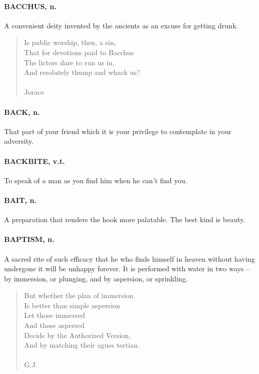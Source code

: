 \documentclass[11pt]{article}
\begin{document}
\paragraph{BACCHUS, n.}  A convenient deity invented by the ancients as an excuse
for getting drunk.

\begin{quote}   Is public worship, then, a sin, \\
      That for devotions paid to Bacchus \\
  The lictors dare to run us in, \\
      And resolutely thump and whack us? \\
 \\
Jorace \end{quote}


\paragraph{BACK, n.}  That part of your friend which it is your privilege to
contemplate in your adversity.

\paragraph{BACKBITE, v.t.}  To speak of a man as you find him when he can't find
you.

\paragraph{BAIT, n.}  A preparation that renders the hook more palatable.  The
best kind is beauty.

\paragraph{BAPTISM, n.}  A sacred rite of such efficacy that he who finds himself
in heaven without having undergone it will be unhappy forever.  It is
performed with water in two ways -- by immersion, or plunging, and by
aspersion, or sprinkling.

\begin{quote}   But whether the plan of immersion \\
  Is better than simple aspersion \\
      Let those immersed \\
      And those aspersed \\
  Decide by the Authorized Version, \\
  And by matching their agues tertian. \\
 \\
G.J. \end{quote}
\end{document}
